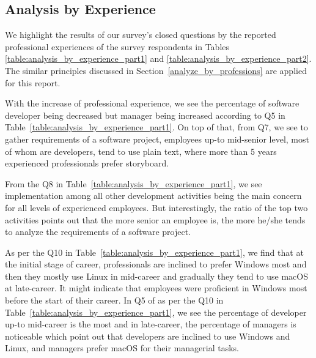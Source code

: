\subsection{Analysis by Experience}

We highlight the results of our survey's closed questions by the reported professional experiences of the survey respondents in Tables \ref{table:analysis_by_experience_part1} and \ref{table:analysis_by_experience_part2}. The similar principles discussed in Section~\ref{analyze_by_professions} are applied for this report.




With the increase of professional experience, we see the percentage of software developer being decreased but manager being increased according to Q5 in Table~\ref{table:analysis_by_experience_part1}. On top of that, from Q7, we see to gather requirements of a software project, employees up-to mid-senior level, most of whom are developers, tend to use plain text, where more than 5 years experienced professionals prefer storyboard.

From the Q8 in Table~\ref{table:analysis_by_experience_part1}, we see implementation among all other development activities being the main concern for all levels of experienced employees. But interestingly, the ratio of the top two activities points out that the more senior an employee is, the more he/she tends to analyze the requirements of a software project.

As per the Q10 in Table~\ref{table:analysis_by_experience_part1}, we find that at the initial stage of career, professionals are inclined to prefer Windows most and then they mostly use Linux in mid-career and gradually they tend to use macOS at late-career. It might indicate that employees were proficient in Windows most before the start of their career. In Q5 of as per the Q10 in Table~\ref{table:analysis_by_experience_part1}, we see the percentage of developer up-to mid-career is the most and in late-career, the percentage of managers is noticeable which point out that developers are inclined to use Windows and Linux, and managers prefer macOS for their managerial tasks.

